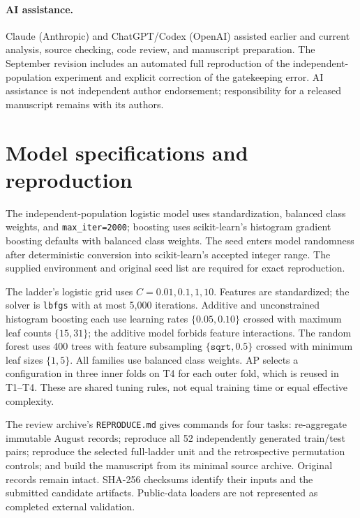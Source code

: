 \documentclass[11pt,a4paper]{article}
\begin{document}
\paragraph{AI assistance.} Claude (Anthropic) and ChatGPT/Codex (OpenAI) assisted earlier and current analysis, source checking, code review, and manuscript preparation. The September revision includes an automated full reproduction of the independent-population experiment and explicit correction of the gatekeeping error. AI assistance is not independent author endorsement; responsibility for a released manuscript remains with its authors.

\appendix
\section{Model specifications and reproduction}\label{app:models}
The independent-population logistic model uses standardization, balanced class weights, and \texttt{max\_iter=2000}; boosting uses scikit-learn's histogram gradient boosting defaults with balanced class weights. The seed enters model randomness after deterministic conversion into scikit-learn's accepted integer range. The supplied environment and original seed list are required for exact reproduction.

The ladder's logistic grid uses $C=0.01,0.1,1,10$. Features are standardized; the solver is \texttt{lbfgs} with at most 5,000 iterations. Additive and unconstrained histogram boosting each use learning rates $\{0.05,0.10\}$ crossed with maximum leaf counts $\{15,31\}$; the additive model forbids feature interactions. The random forest uses 400 trees with feature subsampling $\{\texttt{sqrt},0.5\}$ crossed with minimum leaf sizes $\{1,5\}$. All families use balanced class weights. AP selects a configuration in three inner folds on T4 for each outer fold, which is reused in T1--T4. These are shared tuning rules, not equal training time or equal effective complexity.

The review archive's \texttt{REPRODUCE.md} gives commands for four tasks: re-aggregate immutable August records; reproduce all 52 independently generated train/test pairs; reproduce the selected full-ladder unit and the retrospective permutation controls; and build the manuscript from its minimal source archive. Original records remain intact. SHA-256 checksums identify their inputs and the submitted candidate artifacts. Public-data loaders are not represented as completed external validation.
\end{document}
